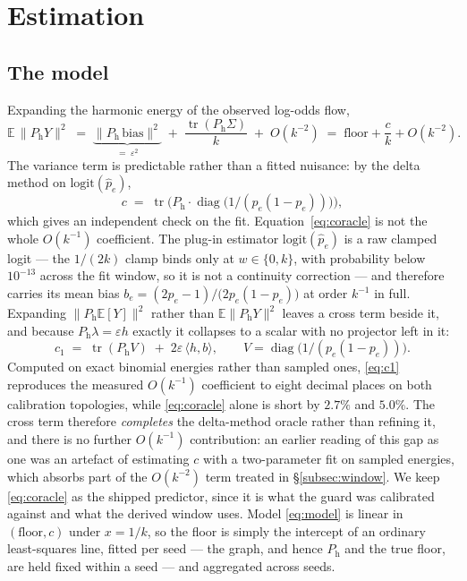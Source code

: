 \documentclass[11pt,a4paper]{article}
\newcommand{\tr}{\operatorname{tr}}
\newcommand{\Ph}{P_{\mathrm{h}}}
\begin{document}
\section{Estimation}\label{sec:estimation}

\subsection{The model}

Expanding the harmonic energy of the observed log-odds flow,
\begin{equation}
\mathbb{E}\,\|\Ph Y\|^2
\;=\; \underbrace{\|\Ph\,\text{bias}\|^2}_{=\;\varepsilon^2}
\;+\; \frac{\tr(\Ph \Sigma)}{k} \;+\; O(k^{-2})
\;=\; \text{floor} + \frac{c}{k} + O(k^{-2}).
\label{eq:model}
\end{equation}
The variance term is predictable rather than a fitted nuisance: by the delta
method on $\mathrm{logit}(\hat p_e)$,
\begin{equation}
c \;=\; \tr\!\Big(\Ph \cdot \operatorname{diag}\big(1/(p_e(1-p_e))\big)\Big),
\label{eq:coracle}
\end{equation}
which gives an independent check on the fit. Equation~\eqref{eq:coracle} is not
the whole $O(k^{-1})$ coefficient. The plug-in estimator $\mathrm{logit}(\hat
p_e)$ is a raw clamped logit --- the $1/(2k)$ clamp binds only at $w\in\{0,k\}$,
with probability below $10^{-13}$ across the fit window, so it is not a
continuity correction --- and therefore carries its mean bias
$b_e=(2p_e-1)/\bigl(2p_e(1-p_e)\bigr)$ at order $k^{-1}$ in full. Expanding
$\|\Ph\mathbb{E}[Y]\|^2$ rather than $\mathbb{E}\|\Ph Y\|^2$ leaves a cross term
beside it, and because $\Ph\lambda = \varepsilon h$ exactly it collapses to a
scalar with no projector left in it:
\begin{equation}
c_1 \;=\; \tr(\Ph V) \;+\; 2\varepsilon\,\langle h, b\rangle,
\qquad V=\operatorname{diag}\big(1/(p_e(1-p_e))\big).
\label{eq:c1}
\end{equation}
Computed on exact binomial energies rather than sampled ones,
\eqref{eq:c1} reproduces the measured $O(k^{-1})$ coefficient to eight decimal
places on both calibration topologies, while \eqref{eq:coracle} alone is short by
$2.7\%$ and $5.0\%$. The cross term therefore \emph{completes} the delta-method
oracle rather than refining it, and there is no further $O(k^{-1})$
contribution: an earlier reading of this gap as one was an artefact of estimating
$c$ with a two-parameter fit on sampled energies, which absorbs part of the
$O(k^{-2})$ term treated in \S\ref{subsec:window}. We keep \eqref{eq:coracle} as
the shipped predictor, since it is what the guard was calibrated against and what
the derived window uses. Model \eqref{eq:model} is linear in
$(\text{floor}, c)$ under $x = 1/k$, so the floor is simply the intercept of an
ordinary least-squares line, fitted per seed --- the graph, and hence $\Ph$ and
the true floor, are held fixed within a seed --- and aggregated across seeds.
\end{document}
